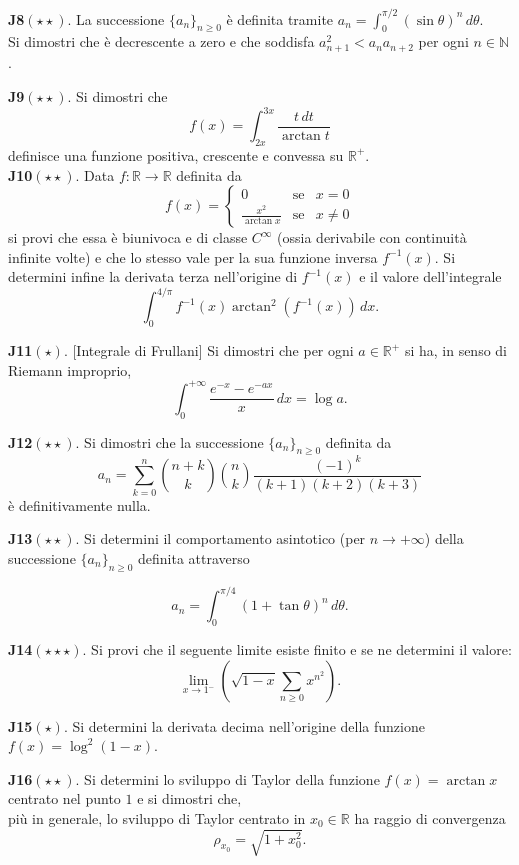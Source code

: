 \documentclass[a4paper,twoside]{article}
\theoremstyle{definition}
\numberwithin{theorem}{section}
\begin{document}
\textbf{J8}$(\star\star)$. La successione $\{a_n\}_{n\geq 0}$ è definita tramite $a_n=\int_{0}^{\pi/2}\left(\sin\theta\right)^n\,d\theta$.\\ Si dimostri che è decrescente a zero e che soddisfa $a_{n+1}^2 < a_n a_{n+2}$ per ogni $n\in\mathbb{N}$.

\textbf{J9}$(\star\star)$. Si dimostri che 
$$ f(x) = \int_{2x}^{3x}\frac{t\,dt}{\arctan t} $$
definisce una funzione positiva, crescente e convessa su $\mathbb{R^+}$. \\

\textbf{J10}$(\star\star)$. Data $f:\mathbb{R}\to\mathbb{R}$ definita da
$$ f(x) = \left\{\begin{array}{ccl}0 & \text{se} &x=0\\\frac{x^2}{\arctan x}&\text{se}& x\neq 0\end{array}\right.$$
si provi che essa è biunivoca e di classe $C^{\infty}$ (ossia derivabile con continuità infinite volte) e che lo stesso vale per la sua funzione inversa $f^{-1}(x)$. Si determini infine la derivata terza nell'origine di $f^{-1}(x)$ e il valore dell'integrale
$$ \int_{0}^{4/\pi}f^{-1}(x)\arctan^2(f^{-1}(x))\,dx.$$

\textbf{J11}$(\star)$. [Integrale di Frullani] Si dimostri che per ogni $a\in\mathbb{R}^+$ si ha, in senso di Riemann improprio,
$$ \int_{0}^{+\infty}\frac{e^{-x}-e^{-ax}}{x}\,dx = \log a.$$

\textbf{J12}$(\star\star)$. Si dimostri che la successione $\{a_n\}_{n\geq 0}$ definita da
$$ a_n = \sum_{k=0}^{n}\binom{n+k}{k}\binom{n}{k}\frac{(-1)^k}{(k+1)(k+2)(k+3)} $$
è definitivamente nulla.

\textbf{J13}$(\star\star)$. Si determini il comportamento asintotico (per $n\to +\infty$) della successione $\{a_n\}_{n\geq 0}$ definita attraverso

$$ a_n = \int_{0}^{\pi/4}\left(1+\tan\theta\right)^n\,d\theta. $$

\textbf{J14}$(\star\star\star)$. Si provi che il seguente limite esiste finito e se ne determini il valore:
$$ \lim_{x\to 1^-}\left(\sqrt{1-x}\sum_{n\geq 0}x^{n^2}\right).$$

\textbf{J15}$(\star)$. Si determini la derivata decima nell'origine della funzione $f(x)=\log^2(1-x)$.

\textbf{J16}$(\star\star)$. Si determini lo sviluppo di Taylor della funzione $f(x)=\arctan x$ centrato nel punto $1$ e si dimostri che,\\ più in generale, lo sviluppo di Taylor centrato in $x_0\in\mathbb{R}$ ha raggio di convergenza 
$$ \rho_{x_0} = \sqrt{1+x_0^2}. $$
\end{document}
